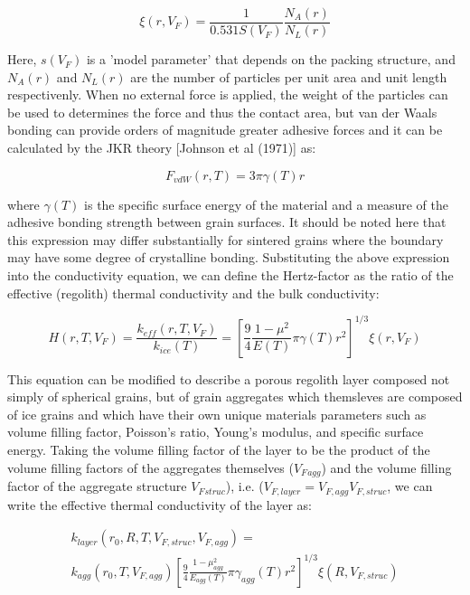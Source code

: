 \documentclass[11pt]{article} %
\newcommand{\vf}{\ensuremath{V_{F}}\xspace}
\begin{document}
	\begin{equation}
	\xi(r, \vf) = \frac{1}{0.531 S(\vf)} \frac{N_{A}(r)}{N_{L}(r)}
	\end{equation}
	 
	 Here, $s(\vf)$ is a 'model parameter' that depends on the packing structure, and $N_{A}(r)$ and $N_{L}(r)$ are the number of particles per unit area and unit length respectivenly.  When no external force is applied, the weight of the particles can be used to determines the force and thus the contact area, but van der Waals bonding can provide orders of magnitude greater adhesive forces and it can be calculated by the JKR theory [Johnson et al (1971)] as:
	 
	 \begin{equation}
	 F_{vdW}(r, T) = 3 \pi \gamma(T) r
	 \end{equation} 
	 
	 where $\gamma(T)$ is the specific surface energy of the material and a measure of the adhesive bonding strength between grain surfaces. It should be noted here that this expression may differ substantially for sintered grains where the boundary may have some degree of crystalline bonding. Substituting the above expression into the conductivity equation, we can define the Hertz-factor as the ratio of the effective (regolith) thermal conductivity and the bulk conductivity:
	 
	 \begin{equation}
	 \label{eq:hertz}
	 H(r, T, \vf) = \frac{k_{eff}(r, T, \vf)}{k_{ice}(T)} = [\frac{9}{4} \frac{1-\mu^{2}}{E(T)} \pi \gamma(T) r^{2} ]^{1/3} \xi(r, \vf)
	 \end{equation}
	 
	 This equation can be modified to describe a porous regolith layer composed not simply of spherical grains, but of grain aggregates which themsleves are composed of ice grains and which have their own unique materials parameters such as volume filling factor, Poisson's ratio, Young's modulus, and specific surface energy. Taking the volume filling factor of the layer to be the product of the volume filling factors of the aggregates themselves (\vf$_{agg}$) and the volume filling factor of the aggregate structure \vf$_{struc}$), i.e. ($V_{F, layer} = V_{F, agg} V_{F, struc}$, we can write the effective thermal conductivity of the layer as:
	 
	 \begin{equation}
	 \begin{split}
	 k_{layer}(r_{0}, R, T, V_{F, struc}, V_{F, agg}) = \\
	 k_{agg}(r_{0}, T, V_{F, agg}) [\frac{9}{4} \frac{1 - \mu_{agg}^{2}}{E_{agg}(T)}  \pi \gamma_{agg}(T) r^{2}]^{1/3} \xi(R, V_{F, struc})
	 \end{split}
	 \end{equation}
	 
\end{document}
